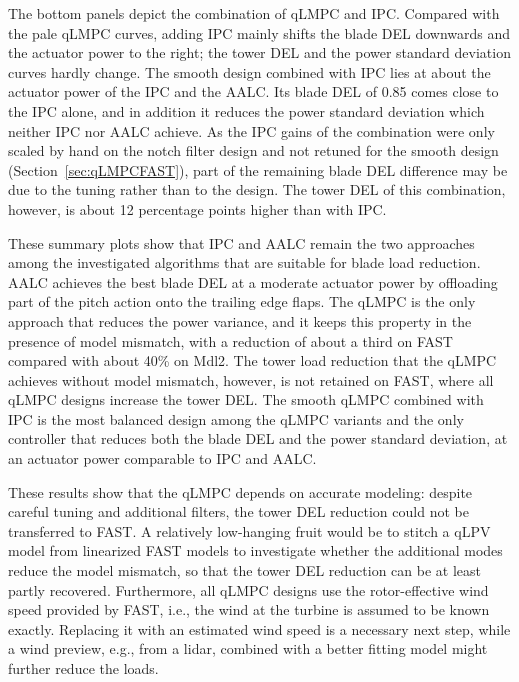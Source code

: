 The bottom panels depict the combination of qLMPC and IPC. Compared with the pale qLMPC curves, adding
IPC mainly shifts the blade DEL downwards and the actuator power to the right; the tower DEL and
the power standard deviation curves hardly change. The smooth design combined with IPC lies at
about the actuator power of the IPC and the AALC. Its blade DEL of 0.85 comes close to 
the IPC alone, and in addition it reduces the power standard deviation  which
neither IPC nor AALC achieve. As the IPC gains of the combination were only scaled by hand on the
notch filter design and not retuned for the smooth design (Section~\ref{sec:qLMPCFAST}), part of
the remaining blade DEL difference may be due to the tuning rather than to the design. The tower
DEL of this combination, however, is about 12 percentage points higher than with IPC.



These summary plots show that IPC and AALC remain the two approaches among the investigated algorithms that are suitable for blade load reduction. AALC achieves the best blade DEL at a moderate actuator power by offloading part of the pitch action onto the trailing edge flaps. The qLMPC is the only approach that reduces the power variance, and it keeps this property in the presence of model mismatch, with a reduction of about a third on FAST compared with about 40\% on Mdl2. The tower load reduction that the qLMPC achieves without model mismatch, however, is not retained on FAST, where all qLMPC designs increase the tower DEL. The smooth qLMPC combined with IPC is the most balanced design among the qLMPC variants and the only controller that reduces both the blade DEL and the power standard deviation, at an actuator power comparable to IPC and AALC.

These results show that the qLMPC depends on accurate modeling: despite careful tuning and additional filters, the tower DEL reduction could not be transferred to FAST. A relatively low-hanging fruit would be to stitch a qLPV model from linearized FAST models to investigate whether the additional modes reduce the model mismatch, so that the tower DEL reduction can be at least partly recovered. Furthermore, all qLMPC designs use the rotor-effective wind speed provided by FAST, i.e., the wind at the turbine is assumed to be known exactly. Replacing it with an estimated wind speed is a necessary next step, while a wind preview, e.g., from a lidar, combined with a better fitting model might further reduce the loads.

